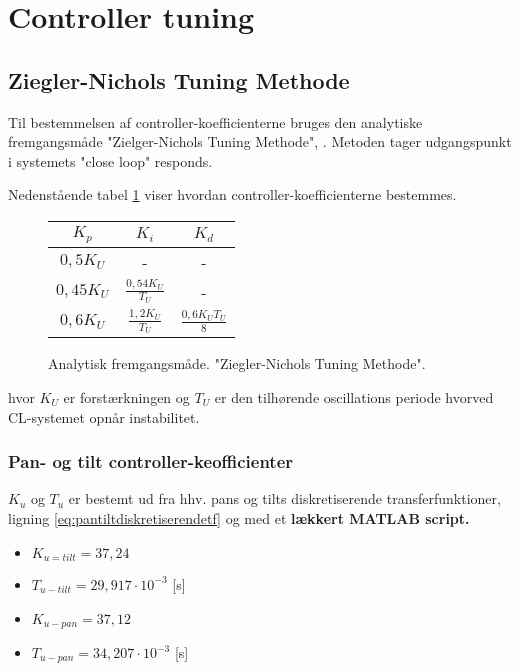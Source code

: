 \section{Controller tuning}
\label{sec:PID}





\subsection{Ziegler-Nichols Tuning Methode}
Til bestemmelsen af controller-koefficienterne bruges den analytiske fremgangsmåde "Zielger-Nichols Tuning Methode", \citep[Kap. 7.6]{reg_modern_control_systems}. 
Metoden tager udgangspunkt i systemets "close loop" responds. 


Nedenstående tabel \ref{tb:ZieglerNichols} viser hvordan controller-koefficienterne bestemmes.

\begin{figure}[th!]
\centering
\begin{tabular}{c|c|c}
\(K_p\) & \(K_i\) & \(K_d\)\\\hline
\(0,5  { K }_{ U }\) &-&-\\
\(0,45  { K }_{ U }\) & \( \frac { 0,54  { K }_{ U } }{ { T }_{ U } }  \) &-\\
\(0,6  { K }_{ U } \) &  \( \frac { 1,2  { K }_{ U } }{ { T }_{ U } }  \) & \(\frac { 0,6  { K }_{ U }  { T }_{ U } }{ 8 }  \)
\end{tabular}
\captionsetup{type=table}
\caption[Ziegler-Nichols Tuning Methode]{Analytisk fremgangsmåde. "Ziegler-Nichols Tuning Methode".}
\label{tb:ZieglerNichols}
\end{figure}

hvor \(K_U\) er forstærkningen og \(T_U\) er den tilhørende oscillations periode hvorved CL-systemet opnår instabilitet.

\subsubsection{Pan- og tilt controller-keofficienter}
\(K_u\) og \(T_u\) er bestemt ud fra hhv. pans og tilts diskretiserende transferfunktioner, ligning \ref{eq:pantiltdiskretiserendetf} og med et \textbf{lækkert MATLAB script.}
\begin{itemize}
\item \(K_{u=tilt} = 37,24\)
\item \(T_{u-tilt} = 29,917 \cdot 10^{-3}\) [s] 
\item \(K_{u-pan} = 37,12\)
\item \(T_{u-pan} = 34,207\cdot 10^{-3}\) [s] 
\end{itemize}



